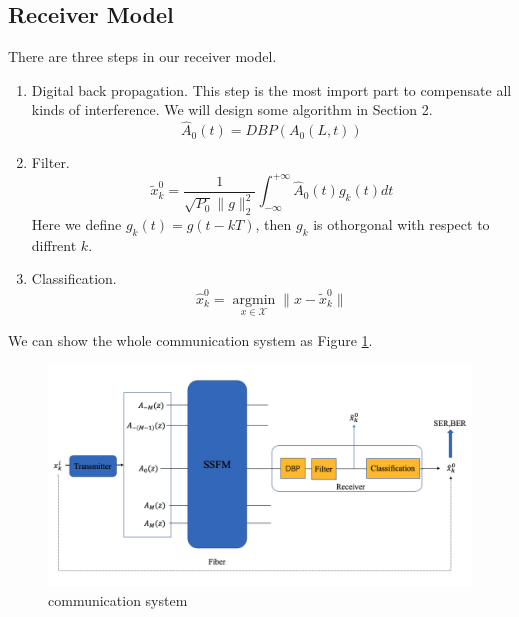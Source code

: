 \subsection{Receiver Model}
There are three steps in our receiver model.
\begin{enumerate}
\item Digital back propagation. This step is the most import part to compensate all kinds of interference. We will design some algorithm in Section 2.
    \begin{equation}\label{DBP}
    \hat{A}_0(t) = DBP(A_0(L,t))
    \end{equation}
\item Filter.
    \begin{equation}
    \tilde{x}_k^0 = \frac{1}{\sqrt{P_0} \|g\|_2^2}\int_{-\infty}^{+\infty} \hat{A}_0(t) g_k(t) dt
    \end{equation}
    Here we define $g_k(t) = g(t - kT)$, then $g_k$ is othorgonal with respect to diffrent $k$.
\item Classification.
    \begin{equation}
    \hat{x}_k^0 = \mathop{argmin}\limits_{x\in \mathcal{X}} \|x - \tilde{x}_k^0\|
    \end{equation}
\end{enumerate}
We can show the whole communication system as Figure \ref{communication system}.

\begin{figure}[htbp]
\centering
\includegraphics[width=0.8\linewidth]{img/com_system.png}
\caption{communication system}
\label{communication system}
\end{figure}













